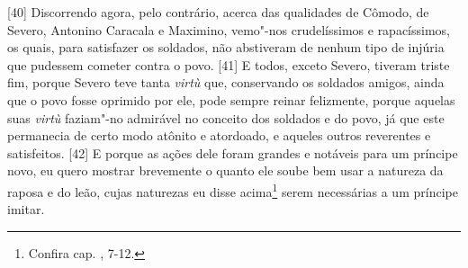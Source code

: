 {[}40{]} Discorrendo agora, pelo contrário, acerca das qualidades de
Cômodo, de Severo, Antonino Caracala e Maximino, vemo"-nos crudelíssimos
e rapacíssimos, os quais, para satisfazer os soldados, não abstiveram de
nenhum tipo de injúria que pudessem cometer contra o povo. {[}41{]} E
todos, exceto Severo, tiveram triste fim, porque Severo teve tanta
\emph{virtù} que, conservando os soldados amigos, ainda que o povo fosse
oprimido por ele, pode sempre reinar felizmente, porque aquelas suas
\emph{virtù} faziam"-no admirável no conceito dos soldados e do povo, já
que este permanecia de certo modo atônito e atordoado, e aqueles outros
reverentes e satisfeitos. {[}42{]} E porque as ações dele foram grandes
e notáveis para um príncipe novo, eu quero mostrar brevemente o quanto
ele soube bem usar a natureza da raposa e do leão, cujas naturezas eu
disse acima\footnote{Confira cap. , 7-12.} serem necessárias a um
príncipe imitar.


